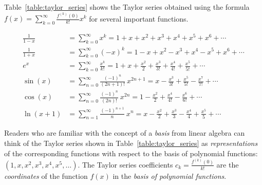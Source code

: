 		Table~\ref{table:taylor_series} shows
		the Taylor series obtained using the formula
		$f(x) = \sum_{k=0}^\infty \frac{f^{(k)}(0)}{k!}x^k$
		for several important functions.

		\begin{table}[htb]
		\vspace{-2mm}
		\centering
		\caption{Taylor series expansions for commonly used functions}
		\vspace{-4mm}
		\begin{shadebox}%
		{ \small
		\vspace{-2mm}
		\begin{align*}
		\frac{1}{1-x}	&=	\sum_{k=0}^\infty x^k
						= 1 + x + x^2 + x^3 + x^4 + x^5 + x^6 + \cdots 							\\
		\frac{1}{1+x}	&=	\sum_{k=0}^\infty (-x)^k
						= 1 - x + x^2 - x^3 + x^4 - x^5 + x^6 + \cdots 							\\
		e^x			&=	\sum_{k=0}^\infty \frac{x^k}{k!}
						= 1 + x + \frac{x^2}{2} + \frac{x^3}{3!} + \frac{x^4}{4!} + \frac{x^5}{5!} + \cdots 	\\
		 \sin(x)  		& = \sum_{n=0}^\infty \frac{(-1)^n}{(2n+1)!} \: x^{2n+1}
		 	  			= x - \frac{x^3}{3!}  + \frac{x^5}{5!} - \frac{x^7}{7!} + \cdots 					\\
		 \cos(x)  		& = \sum_{n=0}^\infty \frac{(-1)^n }{(2n)!}\:x^{2n} 
		 				=  1 - \frac{x^2}{2} + \frac{x^4}{4!} - \frac{x^6}{6!} +  \cdots 					\\
		\!\!\ln(x+1) 		& = \sum_{n=1}^\infty \frac{(-1)^{n+1}}{n}\:x^n
		 				=  x - \frac{x^2}2 + \frac{x^3}{3} - \frac{x^4}{4} + \frac{x^5}{5} + \cdots 		 		
		\end{align*}}%
		\end{shadebox}
		\label{table:taylor_series}
		\vspace{-4mm}
		\end{table}

		Readers who are familiar with the concept of a \emph{basis} from linear algebra
		can think of the Taylor series shown in Table~\ref{table:taylor_series}
		as \emph{representations} of the corresponding functions
		with respect to the basis of polynomial functions:
		$(1, x, x^2, x^3, x^4, x^5, \ldots)$.
		The Taylor series coefficients $c_k = \tfrac{f^{(k)}(0)}{k!}$
		are the \emph{coordinates} of the function $f(x)$
		in the \emph{basis of polynomial functions}.


